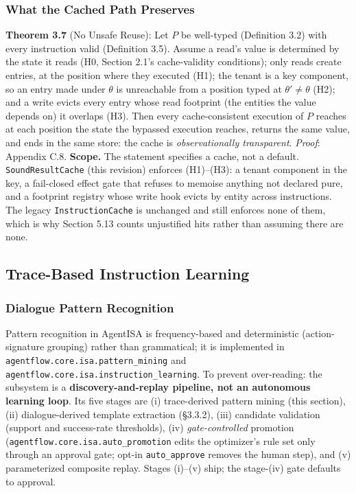 \documentclass[
  sigconf,
  anonymous]{acmart}
\newcounter{none} %
\begin{document}
\subsubsection{What the Cached Path
Preserves}\label{what-the-cached-path-preserves}

\textbf{Theorem 3.7} (No Unsafe Reuse): Let \(P\) be well-typed
(Definition 3.2) with every instruction valid (Definition 3.5). Assume a
read's value is determined by the state it reads (H0, Section 2.1's
cache-validity conditions); only reads create entries, at the position
where they executed (H1); the tenant is a key component, so an entry
made under \(\theta\) is unreachable from a position typed at
\(\theta' \neq \theta\) (H2); and a write evicts every entry whose read
footprint (the entities the value depends on) it overlaps (H3). Then
every cache-consistent execution of \(P\) reaches at each position the
state the bypassed execution reaches, returns the same value, and ends
in the same store: the cache is \emph{observationally transparent}.
\emph{Proof}: Appendix C.8. \textbf{Scope.} The statement specifies a
cache, not a default. \texttt{SoundResultCache} (this revision) enforces
(H1)--(H3): a tenant component in the key, a fail-closed effect gate
that refuses to memoise anything not declared pure, and a footprint
registry whose write hook evicts by entity across instructions. The
legacy \texttt{InstructionCache} is unchanged and still enforces none of
them, which is why Section 5.13 counts unjustified hits rather than
assuming there are none.

\subsection{Trace-Based Instruction
Learning}\label{trace-based-instruction-learning}

\subsubsection{Dialogue Pattern
Recognition}\label{dialogue-pattern-recognition}

Pattern recognition in AgentISA is frequency-based and deterministic
(action-signature grouping) rather than grammatical; it is implemented
in \texttt{agentflow.core.isa.pattern\_mining} and
\texttt{agentflow.core.isa.instruction\_learning}. To prevent
over-reading: the subsystem is a \textbf{discovery-and-replay pipeline,
not an autonomous learning loop}. Its five stages are (i) trace-derived
pattern mining (this section), (ii) dialogue-derived template extraction
(§3.3.2), (iii) candidate validation (support and success-rate
thresholds), (iv) \emph{gate-controlled} promotion
(\texttt{agentflow.core.isa.auto\_promotion} edits the optimizer's rule
set only through an approval gate; opt-in \texttt{auto\_approve} removes
the human step), and (v) parameterized composite replay. Stages (i)--(v)
ship; the stage-(iv) gate defaults to approval.
\end{document}
